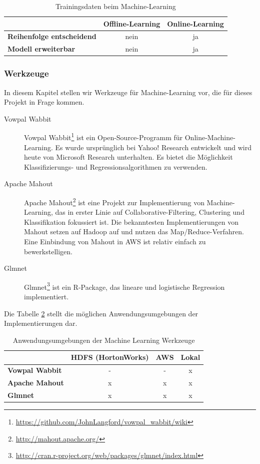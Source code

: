 \begin{table}[H]
	\centering
\begin{tabular}{l|c|c} 
	\textbf{} & \textbf{Offline-Learning} & \textbf{Online-Learning}  \\  
	\hline \textbf{Reihenfolge entscheidend} & nein & ja \\
	\hline \textbf{Modell erweiterbar} & nein & ja 
	\vspace{0.3cm} 
\end{tabular} 
\caption{Trainingsdaten beim Machine-Learning}
\label{tab:MachineLearningTrainingData}
\end{table}
 
\subsubsection{Werkzeuge}
In diesem Kapitel stellen wir Werkzeuge für Machine-Learning vor, die für dieses Projekt in Frage kommen.

\begin{description}
\item[Vowpal Wabbit] Vowpal Wabbit\footnote{\url{https://github.com/JohnLangford/vowpal_wabbit/wiki}} ist ein Open-Source-Programm für Online-Machine-Learning. Es wurde ursprünglich bei Yahoo! Research entwickelt und wird heute von Microsoft Research unterhalten. Es bietet die Möglichkeit Klassifizierungs- und Regressionsalgorithmen zu verwenden.

\item[Apache Mahout] Apache Mahout\footnote{\url{http://mahout.apache.org/}} ist eine Projekt zur Implementierung von Machine-Learning, das in erster Linie auf Collaborative-Filtering, Clustering und Klassifikation fokussiert ist. Die bekanntesten Implementierungen von Mahout setzen auf Hadoop auf und nutzen das Map/Reduce-Verfahren. Eine Einbindung von Mahout in AWS ist relativ einfach zu bewerkstelligen.

\item[Glmnet] Glmnet\footnote{\url{http://cran.r-project.org/web/packages/glmnet/index.html}} ist ein R-Package, das lineare und logistische Regression implementiert.
\end{description}

Die Tabelle \ref{tab:MachineLearningTools} stellt die möglichen Anwendungsumgebungen der Implementierungen dar.

\begin{table}[H]
	\centering
\begin{tabular}{l|c|c|c} 
	\textbf{} & \textbf{HDFS (HortonWorks)} & \textbf{AWS} & \textbf{Lokal}  \\  
	\hline \textbf{Vowpal Wabbit} & - & - & x \\
	\hline \textbf{Apache Mahout} & x & x & x \\
	\hline \textbf{Glmnet} & x & x & x 
	\vspace{0.3cm} 
\end{tabular} 
\caption{Anwendungsumgebungen der Machine Learning Werkzeuge}
\label{tab:MachineLearningTools}
\end{table}

